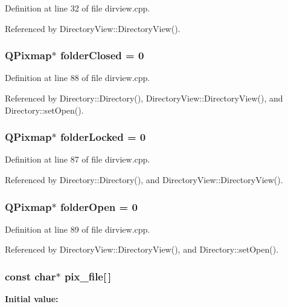 Definition at line 32 of file dirview.cpp.

Referenced by Directory\-View::Directory\-View().
\subsubsection{\setlength{\rightskip}{0pt plus 5cm}QPixmap$\ast$ {\bf folder\-Closed} = 0}\label{dirview_8cpp_a3}




Definition at line 88 of file dirview.cpp.

Referenced by Directory::Directory(), Directory\-View::Directory\-View(), and Directory::set\-Open().
\subsubsection{\setlength{\rightskip}{0pt plus 5cm}QPixmap$\ast$ {\bf folder\-Locked} = 0}\label{dirview_8cpp_a2}




Definition at line 87 of file dirview.cpp.

Referenced by Directory::Directory(), and Directory\-View::Directory\-View().
\subsubsection{\setlength{\rightskip}{0pt plus 5cm}QPixmap$\ast$ {\bf folder\-Open} = 0}\label{dirview_8cpp_a4}




Definition at line 89 of file dirview.cpp.

Referenced by Directory\-View::Directory\-View(), and Directory::set\-Open().
\subsubsection{\setlength{\rightskip}{0pt plus 5cm}const char$\ast$ {\bf pix\_\-file}[$\,$]\hspace{0.3cm}{\tt  [static]}}\label{dirview_8cpp_a1}


{\bf Initial value:}

